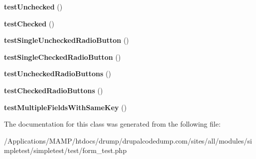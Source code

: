 \begin{DoxyCompactItemize}
\item 
\hypertarget{class_test_of_form_afce290041dc0b035de047c994cef495f}{
{\bfseries testUnchecked} ()}
\label{class_test_of_form_afce290041dc0b035de047c994cef495f}

\item 
\hypertarget{class_test_of_form_a13e80789c8d5cc7799c5feb991819610}{
{\bfseries testChecked} ()}
\label{class_test_of_form_a13e80789c8d5cc7799c5feb991819610}

\item 
\hypertarget{class_test_of_form_af7f35446cac7d4e9d701d4563789a7b3}{
{\bfseries testSingleUncheckedRadioButton} ()}
\label{class_test_of_form_af7f35446cac7d4e9d701d4563789a7b3}

\item 
\hypertarget{class_test_of_form_a47e474170c9f809af22db280b5fa6bb8}{
{\bfseries testSingleCheckedRadioButton} ()}
\label{class_test_of_form_a47e474170c9f809af22db280b5fa6bb8}

\item 
\hypertarget{class_test_of_form_a9d93831658ad5b6d8d00ed56793fd879}{
{\bfseries testUncheckedRadioButtons} ()}
\label{class_test_of_form_a9d93831658ad5b6d8d00ed56793fd879}

\item 
\hypertarget{class_test_of_form_af4ec9afdf81c203f61eb128fa56295eb}{
{\bfseries testCheckedRadioButtons} ()}
\label{class_test_of_form_af4ec9afdf81c203f61eb128fa56295eb}

\item 
\hypertarget{class_test_of_form_aa5c50b2df947f115aa23b71cd1d21838}{
{\bfseries testMultipleFieldsWithSameKey} ()}
\label{class_test_of_form_aa5c50b2df947f115aa23b71cd1d21838}

\end{DoxyCompactItemize}


The documentation for this class was generated from the following file:\begin{DoxyCompactItemize}
\item 
/Applications/MAMP/htdocs/drump/drupalcodedump.com/sites/all/modules/simpletest/simpletest/test/form\_\-test.php\end{DoxyCompactItemize}
